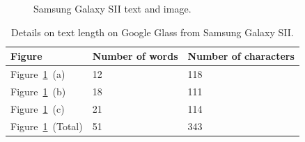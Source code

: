 	\begin{figure}[H]%
		\centering
   		 \qquad
   		 \qquad
   		 \qquad
		\caption{Samsung Galaxy SII text and image.}
		\label{glassTestTextLengthS2Columns}
	\end{figure}

	\begin{table}[ht!]
    		\caption{Details on text length on Google Glass from Samsung Galaxy SII.} \label{tab:glassTestTextLengthS2ColumnsTable}
		\centering \begin{tabularx}{\textwidth}{l|X|X} \hline
		\textbf{Figure} & \textbf{Number of words} & \textbf{Number of characters} \\ \hline \hline
       
		Figure~\ref{glassTestTextLengthS2Columns}~(a)	&12	&118	\\ \hline
		Figure~\ref{glassTestTextLengthS2Columns}~(b)	&18	&111	\\ \hline
		Figure~\ref{glassTestTextLengthS2Columns}~(c)	&21	&114	\\ \hline
		Figure~\ref{glassTestTextLengthS2Columns}~(Total)	&51	&343	\\ \hline
		
		\end{tabularx}
	\end{table}

